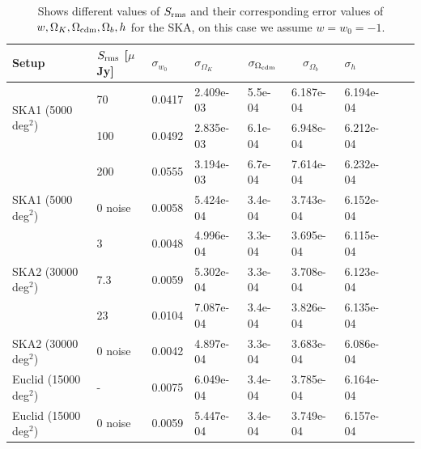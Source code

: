 \documentclass[useAMS,usenatbib]{mn2e}
\begin{document}
\begin{table}
\caption{Shows different values of $S_{\rm rms}$ and their corresponding error values of  $w, \Omega_K,  \Omega_{{\rm cdm}}, \Omega_b, h$  for the SKA, on this case we assume  $w=w_0= -1$.}
\begin{tabular}{ |l|l|l|l||l||l|l|l|l|}
\hline
\hline 
\multirow{1}{*}{Setup}& $S_{\rm rms}$ [$\mu$Jy] & $\sigma_{w_0}$ &  $\sigma_{\Omega_K}$ &  $\sigma_{\Omega_{{\rm cdm}}} $ & $\quad \sigma_{\Omega_b}$ & $\sigma_{h}$ \\
 \hline
\multirow{2}{*}{SKA1 (5000 deg$^2$) }

  & 70& 0.0417 & 2.409e-03 & 5.5e-04 & 6.187e-04 & 6.194e-04  \\
   & 100& 0.0492 & 2.835e-03 & 6.1e-04 & 6.948e-04 & 6.212e-04  \\
     & 200& 0.0555 & 3.194e-03 & 6.7e-04 & 7.614e-04 & 6.232e-04  \\
\hline
 \hline
\multirow{1}{*}{SKA1 (5000 deg$^2$)}
 & 0 noise &  0.0058 & 5.424e-04 & 3.4e-04 & 3.743e-04 & 6.152e-04  \\
 \hline
\multirow{3}{*}{SKA2 (30000 deg$^2$)}

  & 3 & 0.0048 & 4.996e-04 & 3.3e-04 & 3.695e-04 & 6.115e-04  \\
 &7.3& 0.0059 & 5.302e-04 & 3.3e-04 & 3.708e-04 & 6.123e-04  \\
  & 23&0.0104 & 7.087e-04 & 3.4e-04 & 3.826e-04 & 6.135e-04  \\
  \hline
     \hline
\multirow{1}{*}{SKA2 (30000 deg$^2$)}
 & 0 noise & 0.0042 & 4.897e-04 & 3.3e-04 & 3.683e-04 & 6.086e-04  \\
 \hline

\multirow{1}{*}{Euclid (15000 deg$^2$)}
 & - &0.0075 & 6.049e-04 & 3.4e-04 & 3.785e-04 & 6.164e-04  \\
 \hline
    \hline
 \multirow{1}{*}{Euclid (15000 deg$^2$)}
 & 0 noise& 0.0059 & 5.447e-04 & 3.4e-04 & 3.749e-04 & 6.157e-04  \\
 \hline
\end{tabular}
\label{Table:summary_w_ok_all}
\end{table}
\end{document}
